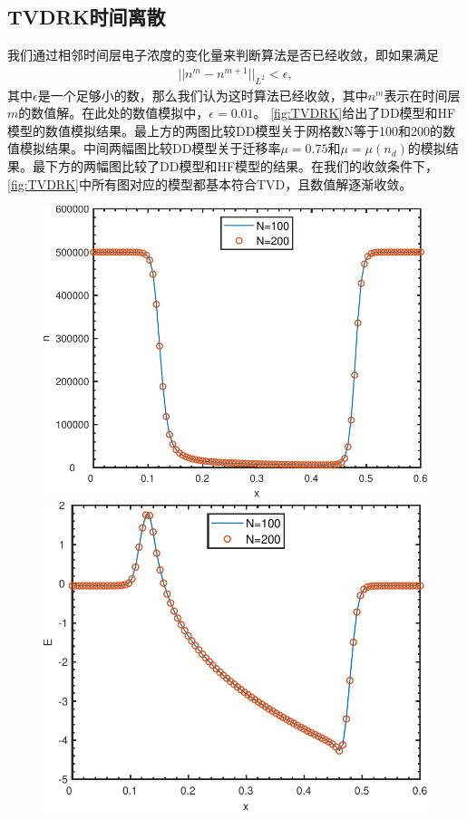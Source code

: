 \subsection{TVDRK时间离散}
我们通过相邻时间层电子浓度的变化量来判断算法是否已经收敛，即如果满足
\begin{align*}
    ||n^m - n^{m+1}||_{L^2} < \epsilon,
\end{align*}
其中$\epsilon$是一个足够小的数，那么我们认为这时算法已经收敛，其中$n^m$表示在时间层$m$的数值解。在此处的数值模拟中，$\epsilon = 0.01$。
\autoref{fig:TVDRK}给出了DD模型和HF模型的数值模拟结果。最上方的两图比较DD模型关于网格数N等于100和200的数值模拟结果。中间两幅图比较DD模型关于迁移率$\mu=0.75$和$\mu = \mu(n_d)$的模拟结果。最下方的两幅图比较了DD模型和HF模型的结果。在我们的收敛条件下，\autoref{fig:TVDRK}中所有图对应的模型都基本符合TVD，且数值解逐渐收敛。
\begin{figure}
    \centering
    \begin{minipage}{0.45\linewidth}
        \centering
        \includegraphics[width=\linewidth]{figure/DDTVDRK3Degree2mu0.75Nn.pdf}
    \end{minipage}
    \hspace{1cm}
    \begin{minipage}{0.45\linewidth}
        \centering
        \includegraphics[width=\linewidth]{figure/DDTVDRK3Degree2mu0.75NE.pdf}

\end{minipage}
\end{figure}
